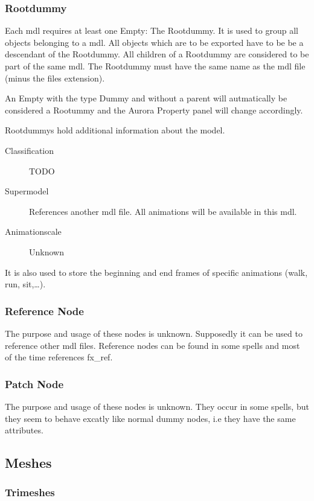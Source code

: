\subsubsection{Rootdummy}
Each mdl requires at least one Empty: The Rootdummy. It is used to group all
objects belonging to a mdl. All objects which are to be exported have to be
be a descendant of the Rootdummy.
All children of a Rootdummy are considered to be part of the same mdl. The
Rootdummy must have the same name as the mdl file (minus the files extension).

An Empty with the type Dummy and without a parent will autmatically be
considered a Rootummy and the Aurora Property panel will change accordingly.

Rootdummys hold additional information about the model.
\begin{description}
    \item[Classification] TODO
    \item[Supermodel] References another mdl file. All animations will be available in this mdl.
    \item[Animationscale] Unknown
\end{description}
It is also used to store the beginning and end frames of specific animations
(walk, run, sit,\ldots).

\subsubsection{Reference Node}
The purpose and usage of these nodes is unknown. Supposedly it can be used to
reference other mdl files. Reference nodes can be found in some spells and
most of the time references fx\_ref.

\subsubsection{Patch Node}
The purpose and usage of these nodes is unknown. They occur in some spells, but
they seem to behave excatly like normal dummy nodes, i.e they have the same
attributes.

\subsection{Meshes}

\subsubsection{Trimeshes}

